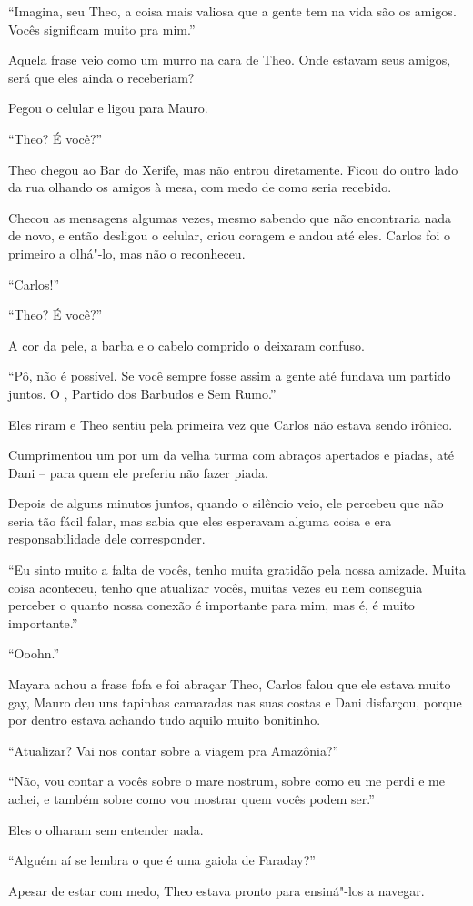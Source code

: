 ``Imagina, seu Theo, a coisa mais valiosa que a gente tem na vida são os
amigos. Vocês significam muito pra mim.''

Aquela frase veio como um murro na cara de Theo. Onde estavam seus
amigos, será que eles ainda o receberiam?

Pegou o celular e ligou para Mauro.

``Theo? É você?''

\asterisc


Theo chegou ao Bar do Xerife, mas não entrou diretamente. Ficou do outro
lado da rua olhando os amigos à mesa, com medo de como seria recebido.

Checou as mensagens algumas vezes, mesmo sabendo que não encontraria
nada de novo, e então desligou o celular, criou coragem e andou até eles.
Carlos foi o primeiro a olhá"-lo, mas não o reconheceu.

``Carlos!''

``Theo? É você?''

A cor da pele, a barba e o cabelo comprido o deixaram confuso.

``Pô, não é possível. Se você sempre fosse assim a gente até fundava um
partido juntos. O , Partido dos Barbudos e Sem Rumo.''

Eles riram e Theo sentiu pela primeira vez que Carlos não estava sendo
irônico.

Cumprimentou um por um da velha turma com abraços apertados e piadas,
até Dani -- para quem ele preferiu não fazer piada.

Depois de alguns minutos juntos, quando o silêncio veio, ele percebeu
que não seria tão fácil falar, mas sabia que eles esperavam alguma coisa
e era responsabilidade dele corresponder.

``Eu sinto muito a falta de vocês, tenho muita gratidão pela nossa
amizade. Muita coisa aconteceu, tenho que atualizar vocês, muitas vezes
eu nem conseguia perceber o quanto nossa conexão é importante para mim,
mas é, é muito importante.''

``Ooohn.''

Mayara achou a frase fofa e foi abraçar Theo, Carlos falou que ele
estava muito gay, Mauro deu uns tapinhas camaradas nas suas costas e
Dani disfarçou, porque por dentro estava achando tudo aquilo muito
bonitinho.

``Atualizar? Vai nos contar sobre a viagem pra Amazônia?''

``Não, vou contar a vocês sobre o mare nostrum, sobre como eu me perdi e
me achei, e também sobre como vou mostrar quem vocês podem ser.''

Eles o olharam sem entender nada.

``Alguém aí se lembra o que é uma gaiola de Faraday?''

Apesar de estar com medo, Theo estava pronto para ensiná"-los a navegar.
